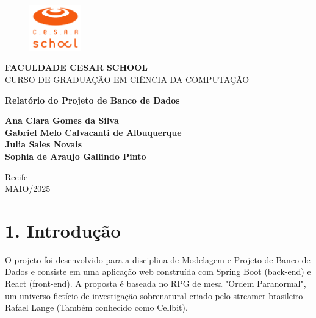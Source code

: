\documentclass[12pt,a4paper]{report}
\begin{document}
\frenchspacing

\begin{titlepage}
\begin{figure}[h!] 
    \centering
    \includegraphics[width=0.2\textwidth]{logo.png}
    \label{fig:minha-figura}
\end{figure}
    \begin{center}
        \large
        \textbf {FACULDADE CESAR SCHOOL}\\
        CURSO DE GRADUAÇÃO EM CIÊNCIA DA COMPUTAÇÃO
        
        \vfill
        
        \Huge
        \textbf{Relatório do Projeto de Banco de Dados}
        
        \vfill
        
        \large
        \textbf {Ana Clara Gomes da Silva\\
        Gabriel Melo Calvacanti de Albuquerque \\
        Julia Sales Novais\\
        Sophia de Araujo Gallindo Pinto}
        
        
        \vfill
        
        \normalsize
        Recife \\
        MAIO/2025
    \end{center}
\end{titlepage}

\newpage
\tableofcontents
\newpage

\renewcommand{\chaptername}{}  
\renewcommand{\thechapter}{}   

\chapter{1. Introdução}

O projeto foi desenvolvido para a disciplina de Modelagem e Projeto de Banco de Dados e consiste em uma aplicação web construída com Spring Boot (back-end) e React (front-end). A proposta é baseada no RPG de mesa "Ordem Paranormal", um universo fictício de investigação sobrenatural criado pelo streamer brasileiro Rafael Lange (Também conhecido como Cellbit).
\end{document}

